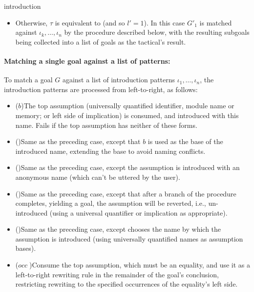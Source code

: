 \begin{tactic}[$\tau$=>$\;\iota_1 \cdots \iota_n$]{introduction}
\begin{tsyntax}[empty]{}
\begin{itemize}
     \item Otherwise, $\tau$ is equivalent to  (and so
       $l'=1$). In this case $G'_1$ is matched against
       $\iota_k,\ldots,\iota_n$ by the procedure described below, with
       the resulting subgoals being collected into a list of goals as
       the tactical's result.
    \end{itemize}

    \paragraph{Matching a single goal against a list of patterns:}

    To match a goal $G$ against a list of introduction patterns
    $\iota_1,\ldots,\iota_n$, the introduction patterns are processed
    from left-to-right, as follows:
    \begin{itemize}
    \item ($b$)\quad The top assumption (universally quantified
      identifier, module name or memory; or left side of implication)
      is consumed, and introduced with this name. Fails if the top
      assumption has neither of these forms.

    \item ()\quad Same as the preceding case, except that
      $b$ is used as the base of the introduced name, extending the
      base to avoid naming conflicts.

    \item (\ec{_})\quad Same as the preceding case, except the
      assumption is introduced with an anonymous name (which can't be
      uttered by the user).

    \item (\ec{+})\quad Same as the preceding case, except that after
      a branch of the procedure completes, yielding a goal, the
      assumption will be reverted, i.e., un-introduced (using a
      universal quantifier or implication as appropriate).

    \item ()\quad Same as the preceding case, except \EasyCrypt
      chooses the name by which the assumption is introduced (using
      universally quantified names as assumption bases).

    \item ($\mathit{occ}\;$\ec{->})\quad Consume the top assumption,
      which must be an equality, and use it as a left-to-right rewriting
      rule in the remainder of the goal's conclusion, restricting rewriting
      to the specified occurrences of the equality's left side.


\end{itemize}
\end{tsyntax}
\end{tactic}
